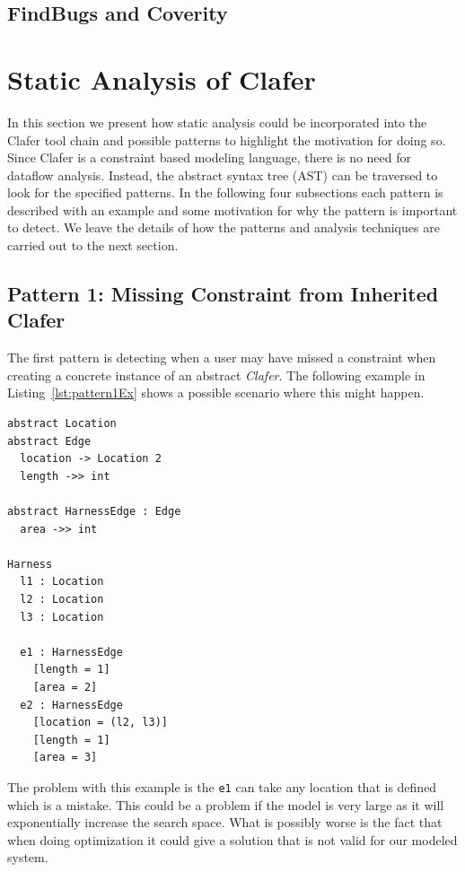 \documentclass[10pt,oneside]{IEEEtran}
\begin{document}
\subsection{FindBugs and Coverity}


\section{Static Analysis of Clafer}
In this section we present how static analysis could be incorporated into the Clafer tool chain and possible patterns to highlight the motivation for doing so. Since Clafer is a constraint based modeling language, there is no need for dataflow analysis. Instead, the abstract syntax tree (AST) can be traversed to look for the specified patterns. In the following four subsections each pattern is described with an example and some motivation for why the pattern is important to detect. We leave the details of how the patterns and analysis techniques are carried out to the next section.%

\subsection{Pattern 1: Missing Constraint from Inherited Clafer}
The first pattern is detecting when a user may have missed a constraint when creating a concrete instance of an abstract \textit{Clafer}. The following example in Listing~\ref{lst:pattern1Ex} shows a possible scenario where this might happen.
\begin{lstlisting}[label={lst:pattern1Ex},caption={Example of Pattern 1}]
abstract Location
abstract Edge
  location -> Location 2
  length ->> int

abstract HarnessEdge : Edge
  area ->> int

Harness
  l1 : Location
  l2 : Location
  l3 : Location

  e1 : HarnessEdge
    [length = 1]
    [area = 2]
  e2 : HarnessEdge
    [location = (l2, l3)]
    [length = 1]
    [area = 3]
\end{lstlisting}
The problem with this example is the \lstinline$e1$ can take any location that is defined which is a mistake. This could be a problem if the model is very large as it will exponentially increase the search space. What is possibly worse is the fact that when doing optimization it could give a solution that is not valid for our modeled system.
\end{document}
